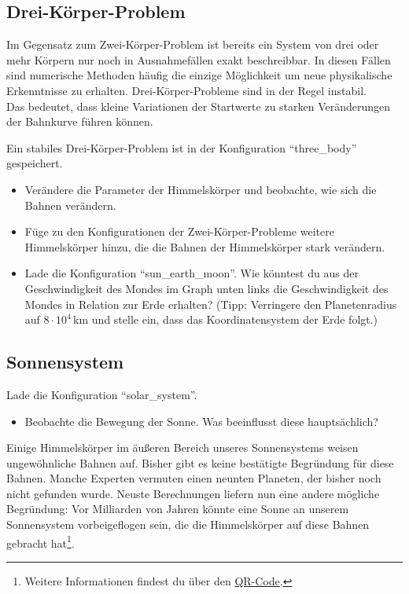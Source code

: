\documentclass{scrartcl}
\begin{document}
        \subsection*{Drei-Körper-Problem}
        Im Gegensatz zum Zwei-Körper-Problem ist bereits ein System von drei oder mehr Körpern nur noch in Ausnahmefällen exakt beschreibbar.
        In diesen Fällen sind numerische Methoden häufig die einzige Möglichkeit um neue physikalische Erkenntnisse zu erhalten.
        Drei-Körper-Probleme sind in der Regel instabil.\\
        
        \noindent Das bedeutet, dass kleine Variationen der Startwerte zu starken Veränderungen der Bahnkurve führen können.
        
        Ein stabiles Drei-Körper-Problem ist in der Konfiguration "`three\_body"' gespeichert.
        \begin{itemize}
            \item Verändere die Parameter der Himmelskörper und beobachte, wie sich die Bahnen verändern.
            \item Füge zu den Konfigurationen der Zwei-Körper-Probleme weitere Himmelskörper hinzu, die die Bahnen der Himmelskörper stark verändern. 
            \item Lade die Konfiguration "`sun\_earth\_moon"'. Wie könntest du aus der Geschwindigkeit des Mondes im Graph unten links die Geschwindigkeit des Mondes in Relation zur Erde erhalten? 
            (Tipp: Verringere den Planetenradius auf $8\cdot10^4\,$km und stelle ein, dass das Koordinatensystem der Erde folgt.)
        \end{itemize}
        \subsection*{Sonnensystem}
        Lade die Konfiguration "`solar\_system"'.
        \begin{itemize}
            \item Beobachte die Bewegung der Sonne. Was beeinflusst diese hauptsächlich? 
        \end{itemize}
        Einige Himmelskörper im äußeren Bereich unseres Sonnensystems weisen ungewöhnliche Bahnen auf.
        Bisher gibt es keine bestätigte Begründung für diese Bahnen. 
        Manche Experten vermuten einen neunten Planeten, der bisher noch nicht gefunden wurde.
        Neuste Berechnungen liefern nun eine andere mögliche Begründung:
        Vor Milliarden von Jahren könnte eine Sonne an unserem Sonnensystem vorbeigeflogen sein, die die Himmelskörper auf diese Bahnen gebracht hat\footnote{Weitere Informationen findest du über den \href{https://www.fr.de/wissen/simulationen-aus-deutschland-zeigen-planet-koennte-etwas-ganz-anderes-sein-zr-93300641.html}{QR-Code}.}.
\end{document}
